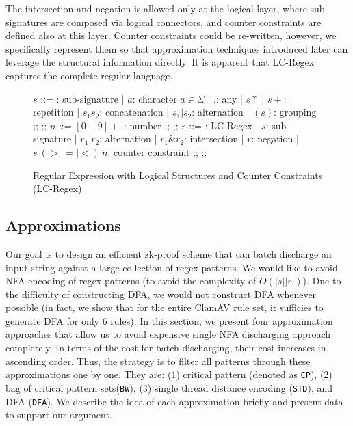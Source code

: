 The intersection and negation is allowed only at the logical
layer, where sub-signatures are composed via logical connectors,
and counter constraints are defined also at this layer.
Counter constraints could be re-written, however, we 
specifically represent them so that approximation techniques
introduced later can leverage the structural information directly.
It is apparent that LC-Regex captures the complete regular language.

\begin{figure}
\begin{small}
\begin{bnf}
$s$  ::=  : \textsf{sub-signature}
| $a$: \textsf{character} $a \in \Sigma$
| $.$: \textsf{any}
| $s*$ | $s+$: \textsf{repetition}
| $s_1 s_2$:  \textsf{concatenation}
| $s_1 \vert s_2$:  \textsf{alternation}
| $(s)$:  \textsf{grouping}
;;
;;
$n$ ::= $[0-9]+$ : \textsf{number}
;;
;;
$r$ ::=  : \textsf{LC-Regex}
| $s$: \textsf{sub-signature}
| $r_1 \vert r_2$: \textsf{alternation}
| $r_1 \& r_2$: \textsf{intersection}
| $\overline{r}$: \textsf{negation}
| $s~ (>\vert=\vert<)~ n$: \textsf{counter constraint}
;;
;;
\end{bnf}
\end{small}
\caption{Regular Expression with Logical Structures and Counter 
Constraints (LC-Regex)} 
\label{fig:lcreg}
\end{figure}

\subsection{Approximations}
Our goal is to design an efficient zk-proof scheme that can batch discharge
an input string against a large collection of regex patterns. We would like
to avoid NFA encoding of regex patterns (to avoid the complexity of
$O(|s||r|)$). Due to the difficulty of constructing DFA, we would not
construct DFA whenever possible (in fact, we show that for the entire
ClamAV rule set, it sufficies to generate DFA for only 6 rules). 
In this section, we present four approximation approaches that allow
us to avoid expensive single NFA discharging approach completely. 
In terms of the cost for batch discharging, their cost increases
in ascending order. Thus, the strategy is to filter all patterns
through these approximations one by one. They are: (1) critical pattern
(denoted as \texttt{CP}), (2) bag of critical pattern sets(\texttt{BW}),
(3) single thread distance encoding (\texttt{STD}), and
DFA (\texttt{DFA}). We describe the idea of each approximation
briefly and present data to support our argument.


